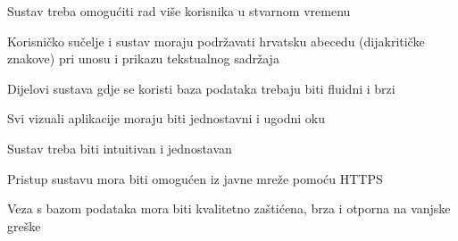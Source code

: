 			 \begin{packed_item}
			 	\item Sustav treba omogućiti rad više korisnika u stvarnom vremenu
			 	\item Korisničko sučelje i sustav moraju podržavati hrvatsku abecedu (dijakritičke znakove) pri unosu i prikazu tekstualnog sadržaja
			 	\item Dijelovi sustava gdje se koristi baza podataka trebaju biti fluidni i brzi
			 	\item Svi vizuali aplikacije moraju biti jednostavni i ugodni oku
			 	\item Sustav treba biti intuitivan i jednostavan
			 	\item Pristup sustavu mora biti omogućen iz javne mreže pomoću HTTPS
			 	\item Veza s bazom podataka mora biti kvalitetno zaštićena, brza i otporna na vanjske greške

			 \end{packed_item}
			 
			 
			 
	